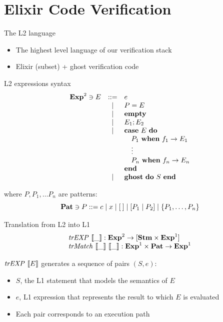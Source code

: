 \documentclass{beamer}
\begin{document}
  \section{Elixir Code Verification}
  \begin{frame}{The L2 language}
    \begin{itemize}
      \item The highest level language of our verification stack
      \item Elixir (subset) + ghost verification code
    \end{itemize}
  \end{frame}
  \begin{frame}{L2 expressions syntax}
    \[
      \begin{array}{rcll}
      \mathbf{Exp}^{2} \ni E & ::= & e \\
      & | & P = E \\
      & | & \textbf{empty} \\
      & | & E_1; E_2 \\
      & | & \textbf{case}~E~\textbf{do} \\
      & & \quad P_1~\textbf{when}~f_1 \rightarrow E_1 \\
      & & \quad \vdots\\
      & & \quad P_n~\textbf{when}~f_n \rightarrow E_n \\
      & & \textbf{end} \\
      & | & \textbf{ghost}~\textbf{do}~S~\textbf{end} \\
      \end{array}
    \]

    where $P, P_1, \dots P_n$ are patterns:
    \[
      \mathbf{Pat} \ni P ::= c \mid x \mid [\:] \mid [P_1 \mid P_2] \mid \{ P_1, \ldots, P_n \}
    \]
  \end{frame}
  \begin{frame}{Translation from L2 into L1}
    \[
      \begin{array}{ll}
        \mathit{trEXP}~\llbracket\_\rrbracket : \mathbf{Exp}^{2} \rightarrow [\mathbf{Stm} \times \mathbf{Exp}^{1}]\\
        \mathit{trMatch}~\llbracket\_\rrbracket~\llbracket\_\rrbracket : \mathbf{Exp}^{1} \times \mathbf{Pat} \rightarrow \mathbf{Exp}^{1}
      \end{array}
    \]

    $\mathit{trEXP}~\llbracket E\rrbracket$ generates a sequence of pairs $(S, e)$:
    \begin{itemize}
      \item $S$, the L1 statement that models the semantics of $E$
      \item $e$, L1 expression that represents the result to which $E$ is evaluated
      \item Each pair corresponds to an execution path
    \end{itemize}
  \end{frame}
\end{document}
